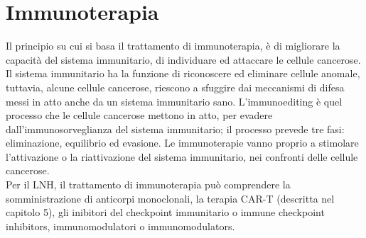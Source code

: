 \section{Immunoterapia}
Il principio su cui si basa il trattamento di immunoterapia, è di migliorare la capacità 
del sistema immunitario, di individuare ed attaccare le cellule cancerose.\\ 
Il sistema immunitario ha la funzione di riconoscere ed eliminare cellule anomale, tuttavia, alcune cellule cancerose, 
riescono a sfuggire dai meccanismi di difesa messi in atto anche da un sistema immunitario sano. 
L’immunoediting è quel processo che le cellule cancerose mettono in atto, per evadere dall’immunosorveglianza del 
sistema immunitario; il processo prevede tre fasi: eliminazione, equilibrio ed evasione. Le immunoterapie vanno 
proprio a stimolare l’attivazione o la riattivazione del sistema immunitario, nei confronti delle cellule 
cancerose\cite{IMMUNOTP}.\\
Per il LNH, il trattamento di immunoterapia può comprendere la somministrazione di anticorpi monoclonali, 
la terapia CAR-T (descritta nel capitolo 5), 
gli inibitori del checkpoint immunitario o immune checkpoint inhibitors, 
immunomodulatori o immunomodulators.

